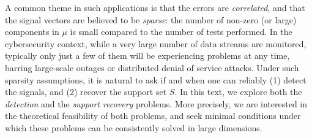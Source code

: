 A common theme in such applications is that the errors are {\em correlated}, and that the signal vectors are believed to be {\em sparse}: the number of non-zero
 (or large) components in $\mu$ is small compared to the number of tests performed.  In the cybersecurity context, while a very large number of data streams are 
 monitored, typically only just a few of them will be experiencing problems at any time, barring large-scale outages or distributed denial of service attacks.
Under such sparsity assumptions, it is natural to ask if and when one can reliably {(1)} detect the signals, and {(2)} recover the support set $S$.
In this text, we explore both the \emph{detection} and the \emph{support recovery} problems.  More precisely, we are interested in the 
theoretical feasibility of both problems, and seek minimal conditions under which these problems can be consistently solved in large 
dimensions.


\medskip


